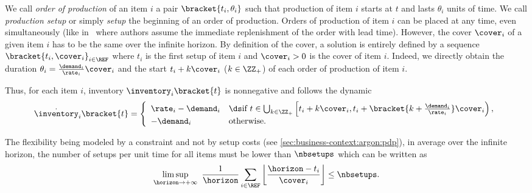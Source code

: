 We call \emph{order of production} of an item $i$ a pair $\bracket{t_i,\theta_i}$ such that production of item $i$ starts at $t$ and lasts $\theta_i$ units of time.
We call \emph{production setup} or simply \emph{setup} the beginning of an order of production.
Orders of production of item $i$ can be placed at any time, even simultaneously (like in~\cite{Ohno2001} where authors assume the immediate replenishment of the order with lead time).
However, the cover $\cover_i$ of a given item $i$ has to be the same over the infinite horizon.
By definition of the cover, a solution is entirely defined by a sequence $\bracket{t_i,\cover_i}_{i\in\REF}$ where $t_i$ is the first setup of item $i$ and $\cover_i>0$ is the cover of item $i$.
Indeed, we directly obtain the duration $\theta_i=\frac{\demand_i}{\rate_i}\cover_i$ and the start $t_i+k\cover_i$ ($k\in\ZZ_+$) of each order of production of item $i$.

Thus, for each item $i$, inventory $\inventory_i\bracket{t}$ is nonnegative and follows the dynamic
\begin{equation}\label{eq:lot-size:single-line:deterministic:motivations:dynamic}
  \dot{\inventory}_i\bracket{t} =
  \left\{
  \begin{array}{ll}
  \rate_i-\demand_i
  & \ds\mbox{if}\ t\in\bigcup_{k\in\ZZ_+} \left[t_i+k\cover_i,t_i+\bracket{k+\frac{\demand_i}{\rate_i}}\cover_i\right),
  \\
  -\demand_i
  & \mbox{otherwise}.
  \end{array}
  \right.
\end{equation}

The flexibility being modeled by a constraint and not by setup costs (see \cref{sec:business-context:argon:pdp}), in average over the infinite horizon, the number of setups per unit time for all items must be lower than $\nbsetups$ which can be written as
\begin{equation}\label{eq:lot-size:single-line:deterministic:motivations:flexibility}
  \limsup_{\horizon\rightarrow+\infty}\ \frac{1}{\horizon} \sum_{i\in\REF} \left\lfloor\frac{\horizon-t_i}{\cover_i}\right\rfloor \le \nbsetups.
\end{equation}


